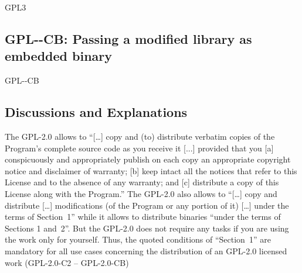 \begin{license}{GPL3}
\subsection{GPL-\ver-CB: Passing a modified library as embedded binary}
\begin{lsuc}{GPL-\ver-CB}

  \useCaseB

  \begin{lsucrequires}
    \lsucmandatory{\keepLicenseElements}
    \lsucmandatory{\gplthreeEnsureCopyrightNoticeBinary}
    \lsucmandatory{\giveLicense}\passingFilesCorrectly
    \lsucmandatory{\retainCopyrightNotices}
    \lsucmandatory{\makeAllSourcesAvailable}
    \lsucmandatory{\describeHowToGetSource}
    \lsucmandatory{\addToCopyrightDialogLib}
    \lsucmandatory{\markEmbeddedModifications}
    \lsucmandatory{\arrangeEmbeddedChanges}\howToApplyTheseTerms
    \lsucmandatory{\arrangeEnclosingBinaries}
    \lsucoptional{\createChangelog}
    \lsucoptional{\addToDocumentation}
  \end{lsucrequires}

  \begin{lsucprohibits}
    \lsucitem{\noPatentLitigation}
  \end{lsucprohibits}
\end{lsuc}

\end{license}


\subsection{Discussions and Explanations}

\newcommand{\gplTwoAndThree}[2]{\footnote{%
    For GPL-2.0 see \cite[cf.][\nopage wp.\ #1]{Gpl20OsiLicense1991a}.\par\noindent 
    For GPL-3.0 see \cite[cf.][\nopage wp.\ #2]{Gpl30OsiLicense2007a}.}} 

The GPL-2.0 allows to \enquote{[\ldots] copy and (to) distribute verbatim copies
of the Program's complete source code as you receive it [...] provided that
you [a] conspicuously and appropriately publish on each copy an appropriate
copyright notice and disclaimer of warranty; [b] keep intact all the notices
that refer to this License and to the absence of any warranty; and [c]
distribute a copy of this License along with the Program.} The
GPL-2.0 also allows to \enquote{[\ldots] copy and distribute [\ldots]
modifications (of the Program or any portion of it) [\ldots] under the terms
of Section~1} while it allows to distribute binaries
\enquote{under the terms of Sections 1 and~2}. But the GPL-2.0
does not require any tasks if you are using the work only for yourself. Thus,
the quoted conditions of \enquote{Section~1} are mandatory for all use cases
concerning the distribution of an GPL-2.0 licensed work (GPL-2.0-C2 --
GPL-2.0-CB)
  
